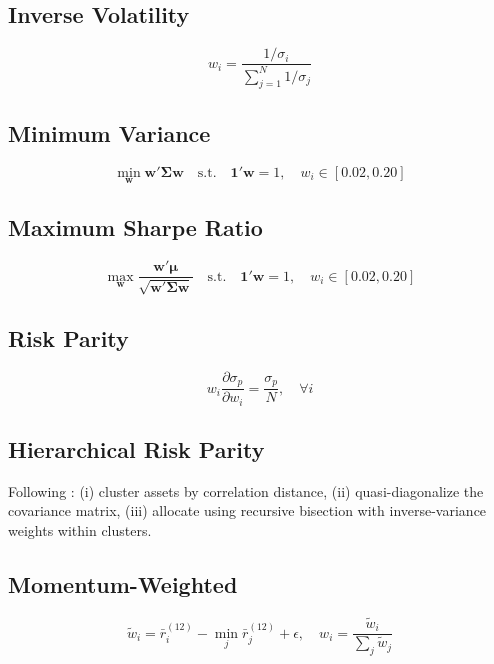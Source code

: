 \documentclass[12pt,a4paper]{article}
\begin{document}
\subsection{Inverse Volatility}
\begin{equation}
    w_i = \frac{1/\sigma_i}{\sum_{j=1}^N 1/\sigma_j}
\end{equation}

\subsection{Minimum Variance}
\begin{equation}
    \min_{\mathbf{w}} \mathbf{w}'\boldsymbol{\Sigma}\mathbf{w} \quad \text{s.t.} \quad \mathbf{1}'\mathbf{w} = 1, \quad w_i \in [0.02, 0.20]
\end{equation}

\subsection{Maximum Sharpe Ratio}
\begin{equation}
    \max_{\mathbf{w}} \frac{\mathbf{w}'\boldsymbol{\mu}}{\sqrt{\mathbf{w}'\boldsymbol{\Sigma}\mathbf{w}}} \quad \text{s.t.} \quad \mathbf{1}'\mathbf{w} = 1, \quad w_i \in [0.02, 0.20]
\end{equation}

\subsection{Risk Parity}
\begin{equation}
    w_i \frac{\partial \sigma_p}{\partial w_i} = \frac{\sigma_p}{N}, \quad \forall i
\end{equation}

\subsection{Hierarchical Risk Parity}
Following \citet{lopezdeprado2016}: (i) cluster assets by correlation distance, (ii) quasi-diagonalize the covariance matrix, (iii) allocate using recursive bisection with inverse-variance weights within clusters.

\subsection{Momentum-Weighted}
\begin{equation}
    \tilde{w}_i = \bar{r}_i^{(12)} - \min_j \bar{r}_j^{(12)} + \epsilon, \quad w_i = \frac{\tilde{w}_i}{\sum_j \tilde{w}_j}
\end{equation}
\end{document}
